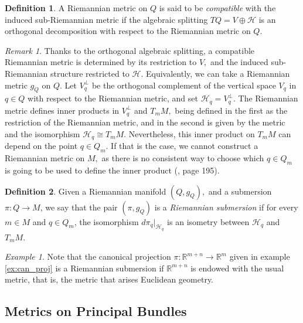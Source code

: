 \documentclass[12pt, letterpaper, reqno]{amsart}
\theoremstyle{definition}
\newtheorem{df}{Definition}
\theoremstyle{plain}
\theoremstyle{remark}
\newtheorem{ex}{Example}
\newtheorem{rem}{Remark}
\begin{document}
\begin{df}\label{df:compatible}
	A Riemannian metric on $ Q $ is said to be \textit{compatible} with the induced sub-Riemannian metric if the algebraic splitting $ TQ = V \oplus \mathcal{H} $ is an orthogonal decomposition with respect to the Riemannian metric on $ Q$.  
\end{df}

\begin{rem}
Thanks to the orthogonal algebraic splitting, a compatible Riemannian metric is determined by its restriction to $ V, $ and the induced sub-Riemannian structure restricted to $ \mathcal{H} $. Equivalently, we can take a Riemannian metric $ g_Q $ on $ Q. $ Let $ V_q^\perp $ be the orthogonal complement of the vertical space $ V_q $ in $ q\in Q $ with respect to the Riemannian metric, and set $ \mathcal{H}_q=V_q^\perp. $ The Riemannian metric defines inner products in $ V_q^\perp $  and $ T_mM, $ being defined in the first as the restriction of the Riemannian metric, and in the second is given by the metric and the isomorphism $ \mathcal{H}_q\cong T_mM. $ Nevertheless, this inner product on $ T_mM $ can depend on the point $ q\in Q_m $. If that is the case, we cannot construct a Riemannian metric on $ M, $ as there is no consistent way to choose which $ q\in Q_m $ is going to be used to define the inner product (\cite{montgomery2002tour}, page 195).
\end{rem}

\begin{df}\label{def:riemannian_submersion}
	Given a Riemannian manifold $ (Q, g_Q),$ and a submersion $ \pi: Q \rightarrow {M}
	$, we say that the pair $ (\pi, g_Q) $ is a \textit{Riemannian submersion} if for every $ m\in M $ and $ q\in Q_m $,  the isomorphism $ d\pi_q |_{\mathcal{H}_q} $ is an isometry between $ \mathcal{H}_q $ and $ T_m M$. 
\end{df}
\begin{ex}
	Note that the canonical projection $ \pi : \mathbb{R}^{m+n} \rightarrow \mathbb{R}^m $ given in example \ref{ex:can_proj} is a Riemannian submersion if $ \mathbb{R}^{m+n} $ is endowed with the usual metric, that is, the metric that arises Euclidean geometry.
\end{ex}
\subsection{Metrics on Principal Bundles}%
\label{sub:metrics_on_principal_bundles}
\end{document}
